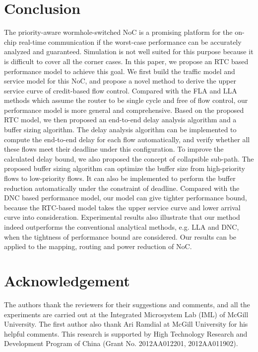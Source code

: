 \documentclass[10pt,journal]{IEEEtran}
\begin{document}
\section{Conclusion}\label{conclusion}
The priority-aware wormhole-switched NoC is a promising platform for the on-chip real-time communication if the worst-case performance can be accurately analyzed and guaranteed. Simulation is not well suited for this purpose because it is difficult to cover all the corner cases. In this paper, we propose an RTC based performance model to achieve this goal. We first build the traffic model and service model for this NoC, and propose a novel method to derive the upper service curve of credit-based flow control. Compared with the FLA and LLA methods which assume the router to be single cycle and free of flow control, our performance model is more general and comprehensive. Based on the proposed RTC model, we then proposed an end-to-end delay analysis algorithm and a buffer sizing algorithm. The delay analysis algorithm can be implemented to compute the end-to-end delay for each flow automatically, and verify whether all these flows meet their deadline under this configuration. To improve the calculated delay bound, we also proposed the concept of collapsible sub-path. The proposed buffer sizing algorithm can optimize the buffer size from high-priority flows to low-priority flows. It can also be implemented to perform the buffer reduction automatically under the constraint of deadline. Compared with the DNC based performance model, our model can give tighter performance bound, because the RTC-based model takes the upper service curve and lower arrival curve into consideration. Experimental results also illustrate that our method indeed outperforms the conventional analytical methods, e.g. LLA and DNC, when the tightness of performance bound are considered. Our results can be applied to the mapping, routing and power reduction of NoC.

\section*{Acknowledgement}
The authors thank the reviewers for their suggestions and comments, and all the experiments are carried out at the Integrated Microsystem Lab (IML) of McGill University. The first author also thank Ari Ramdial at McGill University for his helpful comments. This research is supported by High Technology Research and Development Program of China (Grant No. 2012AA012201, 2012AA011902).



\end{document}
